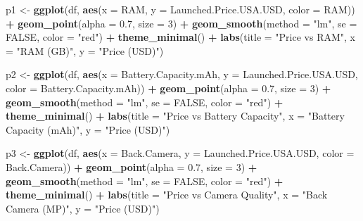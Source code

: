 \documentclass[
]{article}
\newenvironment{Shaded}{\begin{snugshade}}{\end{snugshade}}
\newcommand{\AttributeTok}[1]{\textcolor[rgb]{0.13,0.29,0.53}{#1}}
\newcommand{\ConstantTok}[1]{\textcolor[rgb]{0.56,0.35,0.01}{#1}}
\newcommand{\DecValTok}[1]{\textcolor[rgb]{0.00,0.00,0.81}{#1}}
\newcommand{\FloatTok}[1]{\textcolor[rgb]{0.00,0.00,0.81}{#1}}
\newcommand{\FunctionTok}[1]{\textcolor[rgb]{0.13,0.29,0.53}{\textbf{#1}}}
\newcommand{\NormalTok}[1]{#1}
\newcommand{\OtherTok}[1]{\textcolor[rgb]{0.56,0.35,0.01}{#1}}
\newcommand{\SpecialCharTok}[1]{\textcolor[rgb]{0.81,0.36,0.00}{\textbf{#1}}}
\newcommand{\StringTok}[1]{\textcolor[rgb]{0.31,0.60,0.02}{#1}}
\begin{document}
\begin{Shaded}
\begin{Highlighting}[]
\NormalTok{p1 }\OtherTok{\textless{}{-}} \FunctionTok{ggplot}\NormalTok{(df, }\FunctionTok{aes}\NormalTok{(}\AttributeTok{x =}\NormalTok{ RAM, }\AttributeTok{y =}\NormalTok{ Launched.Price.USA.USD, }\AttributeTok{color =}\NormalTok{ RAM)) }\SpecialCharTok{+}
  \FunctionTok{geom\_point}\NormalTok{(}\AttributeTok{alpha =} \FloatTok{0.7}\NormalTok{, }\AttributeTok{size =} \DecValTok{3}\NormalTok{) }\SpecialCharTok{+}
  \FunctionTok{geom\_smooth}\NormalTok{(}\AttributeTok{method =} \StringTok{"lm"}\NormalTok{, }\AttributeTok{se =} \ConstantTok{FALSE}\NormalTok{, }\AttributeTok{color =} \StringTok{"red"}\NormalTok{) }\SpecialCharTok{+}  
  \FunctionTok{theme\_minimal}\NormalTok{() }\SpecialCharTok{+}
  \FunctionTok{labs}\NormalTok{(}\AttributeTok{title =} \StringTok{"Price vs RAM"}\NormalTok{, }\AttributeTok{x =} \StringTok{"RAM (GB)"}\NormalTok{, }\AttributeTok{y =} \StringTok{"Price (USD)"}\NormalTok{)}

\NormalTok{p2 }\OtherTok{\textless{}{-}} \FunctionTok{ggplot}\NormalTok{(df, }\FunctionTok{aes}\NormalTok{(}\AttributeTok{x =}\NormalTok{ Battery.Capacity.mAh, }\AttributeTok{y =}\NormalTok{ Launched.Price.USA.USD, }\AttributeTok{color =}\NormalTok{ Battery.Capacity.mAh)) }\SpecialCharTok{+}
  \FunctionTok{geom\_point}\NormalTok{(}\AttributeTok{alpha =} \FloatTok{0.7}\NormalTok{, }\AttributeTok{size =} \DecValTok{3}\NormalTok{) }\SpecialCharTok{+}
  \FunctionTok{geom\_smooth}\NormalTok{(}\AttributeTok{method =} \StringTok{"lm"}\NormalTok{, }\AttributeTok{se =} \ConstantTok{FALSE}\NormalTok{, }\AttributeTok{color =} \StringTok{"red"}\NormalTok{) }\SpecialCharTok{+}
  \FunctionTok{theme\_minimal}\NormalTok{() }\SpecialCharTok{+}
  \FunctionTok{labs}\NormalTok{(}\AttributeTok{title =} \StringTok{"Price vs Battery Capacity"}\NormalTok{, }\AttributeTok{x =} \StringTok{"Battery Capacity (mAh)"}\NormalTok{, }\AttributeTok{y =} \StringTok{"Price (USD)"}\NormalTok{)}

\NormalTok{p3 }\OtherTok{\textless{}{-}} \FunctionTok{ggplot}\NormalTok{(df, }\FunctionTok{aes}\NormalTok{(}\AttributeTok{x =}\NormalTok{ Back.Camera, }\AttributeTok{y =}\NormalTok{ Launched.Price.USA.USD, }\AttributeTok{color =}\NormalTok{ Back.Camera)) }\SpecialCharTok{+}
  \FunctionTok{geom\_point}\NormalTok{(}\AttributeTok{alpha =} \FloatTok{0.7}\NormalTok{, }\AttributeTok{size =} \DecValTok{3}\NormalTok{) }\SpecialCharTok{+}
  \FunctionTok{geom\_smooth}\NormalTok{(}\AttributeTok{method =} \StringTok{"lm"}\NormalTok{, }\AttributeTok{se =} \ConstantTok{FALSE}\NormalTok{, }\AttributeTok{color =} \StringTok{"red"}\NormalTok{) }\SpecialCharTok{+}
  \FunctionTok{theme\_minimal}\NormalTok{() }\SpecialCharTok{+}
  \FunctionTok{labs}\NormalTok{(}\AttributeTok{title =} \StringTok{"Price vs Camera Quality"}\NormalTok{, }\AttributeTok{x =} \StringTok{"Back Camera (MP)"}\NormalTok{, }\AttributeTok{y =} \StringTok{"Price (USD)"}\NormalTok{)}


\end{Highlighting}
\end{Shaded}
\end{document}
